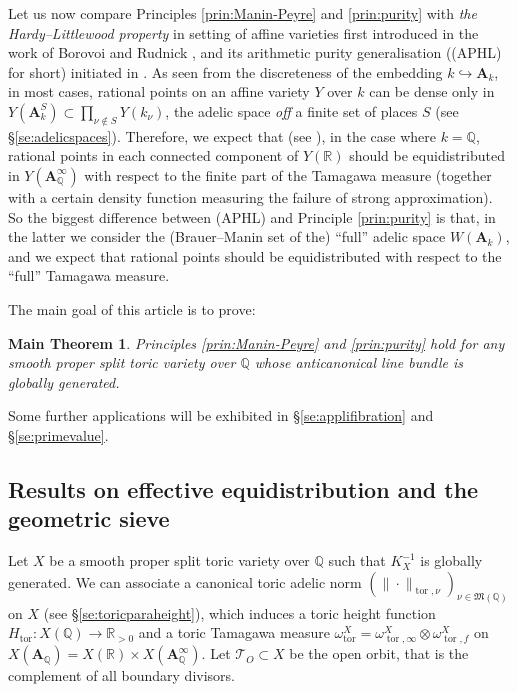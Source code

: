 \documentclass[11pt,letterpaper]{amsart}
\newcommand{\BQ}{{\mathbb {Q}}}
\newcommand{\BR}{{\mathbb {R}}}
\newcommand{\CT}{{\mathcal {T}}}
\newcommand{\RA}{{\mathbf {A}}}
\theoremstyle{plain}
\numberwithin{equation}{section}
\newtheorem*{mainthm}{Main Theorem}
\theoremstyle{definition}
\theoremstyle{remark}
\begin{document}
Let us now compare Principles \ref{prin:Manin-Peyre} and \ref{prin:purity} with \emph{the Hardy--Littlewood property} in setting of affine varieties first introduced in  the work of Borovoi and Rudnick \cite{Borovoi-Rudnick}, and its arithmetic purity generalisation ((APHL) for short) initiated in \cite[Question 1.1]{Cao-Huang2}. As seen from the discreteness of the embedding $k\hookrightarrow \RA_k$, in most cases, rational points on an affine variety $Y$ over $k$ can be dense only in $Y(\RA_k^S)\subset \prod_{\nu\notin S} Y(k_\nu)$, the adelic space \emph{off} a finite set of places $S$ (see \S\ref{se:adelicspaces}). Therefore, we expect that (see \cite[Definition 1.2]{Cao-Huang2}), in the case where $k=\BQ$, rational points in each connected component of $Y(\BR)$ should be equidistributed in $Y(\RA_\BQ^\infty)$ with respect to the finite part of the Tamagawa measure (together with a certain density function measuring the failure of strong approximation). So the biggest difference between (APHL) and Principle \ref{prin:purity} is that, in the latter we consider the (Brauer--Manin set of the) ``full'' adelic space $W(\RA_k)$, and we expect that rational points should be equidistributed with respect to the ``full'' Tamagawa measure.


The main goal of this article is to prove:
\begin{mainthm}
	Principles \ref{prin:Manin-Peyre} and \ref{prin:purity} hold  for any smooth proper split toric variety over $\BQ$ whose anticanonical line bundle is globally generated.
\end{mainthm}


Some further applications will be exhibited in \S\ref{se:applifibration} and \S\ref{se:primevalue}.
\subsection{Results on effective equidistribution and the geometric sieve}\label{se:results}
Let $X$ be a smooth proper split toric variety over $\BQ$ such that $K_X^{-1}$ is globally generated. We can associate a canonical toric adelic norm $(\|\cdot\|_{\operatorname{tor},\nu})_{\nu\in\mathfrak{M}(\BQ)}$ on $X$ (see \S\ref{se:toricparaheight}), which induces a toric height function $H_{\operatorname{tor}}:X(\BQ)\to\BR_{>0}$ and a toric Tamagawa measure $\omega_{\operatorname{tor}}^X=\omega_{\operatorname{tor},\infty}^X \otimes \omega_{\operatorname{tor},f}^X$ on $X(\RA_\BQ)=X(\BR)\times X(\RA_\BQ^\infty)$. Let $\CT_{O}\subset X$ be the open orbit, that is the complement of all boundary divisors.  
\end{document}
